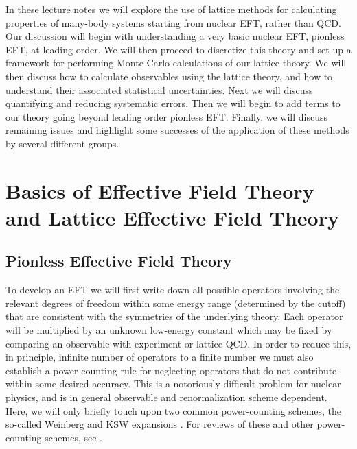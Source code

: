 In these lecture notes we will explore the use of lattice methods for calculating properties of many-body systems starting from nuclear EFT, rather than QCD. Our discussion will begin with understanding a very basic nuclear EFT, pionless EFT, at leading order. We will then proceed to discretize this theory and set up a framework for performing Monte Carlo calculations of our lattice theory. We will then discuss how to calculate observables using the lattice theory, and how to understand their associated statistical uncertainties. Next we will discuss quantifying and reducing systematic errors. Then we will begin to add terms to our theory going beyond leading order pionless EFT. Finally, we will discuss remaining issues and highlight some successes of the application of these methods by several different groups.

\section{Basics of Effective Field Theory and Lattice Effective Field Theory}
\subsection{\label{sec:EFT}Pionless Effective Field Theory}
To develop an EFT we will first write down all possible operators involving the relevant degrees of freedom within some energy range (determined by the cutoff) that are consistent with the symmetries of the underlying theory. Each operator will be multiplied by an unknown low-energy constant which may be fixed by comparing an observable with experiment or lattice QCD. In order to reduce this, in principle, infinite number of operators to a finite number we must also establish a power-counting rule for neglecting operators that do not contribute within some desired accuracy. This is a notoriously difficult problem for nuclear physics, and is in general observable and renormalization scheme dependent. Here, we will only briefly touch upon two common power-counting schemes, the so-called Weinberg and KSW expansions \cite{Weinberg:1990rz,Weinberg:1991um,Kaplan:1996xu,Kaplan:1998tg,Kaplan:1998we}. For reviews of these and other power-counting schemes, see \cite{Epelbaum:2008ga,Epelbaum:2010nr,Machleidt:2011zz}.

